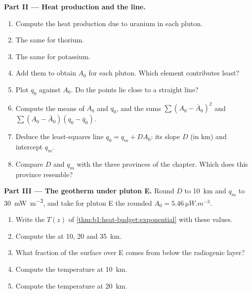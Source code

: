 \begin{problem}
\noindent\textbf{Part II --- Heat production and the line.}
\begin{enumerate}[resume]
  \item Compute the heat production due to uranium in each pluton.
  \item The same for thorium.
  \item The same for potassium.
  \item Add them to obtain $A_0$ for each pluton. Which element contributes
        least?
  \item Plot $q_0$ against $A_0$. Do the points lie close to a straight line?
  \item Compute the means of $A_0$ and $q_0$, and the sums
        $\sum (A_0 - \bar A_0)^2$ and $\sum (A_0 - \bar A_0)(q_0 - \bar q_0)$.
  \item Deduce the least-squares line $q_0 = q_m + D A_0$: its slope $D$ (in
        \unit{km}) and intercept $q_m$.
  \item Compare $D$ and $q_m$ with the three provinces of the chapter. Which
        does this province resemble?
\end{enumerate}

\noindent\textbf{Part III --- The geotherm under pluton E.}
Round $D$ to \qty{10}{km} and $q_m$ to \qty{30}{mW.m^{-2}}, and take for
pluton E the rounded $A_0 = \qty{5.46}{\micro W.m^{-3}}$.
\begin{enumerate}[resume]
  \item Write the  $T(z)$ of \cref{thm:b1:heat-budget:exponential} with
        these values.
  \item Compute the  at 10, 20 and \qty{35}{km}.
  \item What fraction of the surface  over E comes from below the
        radiogenic layer?
  \item Compute the temperature at \qty{10}{km}.
  \item Compute the temperature at \qty{20}{km}.
\end{enumerate}


\end{problem}
